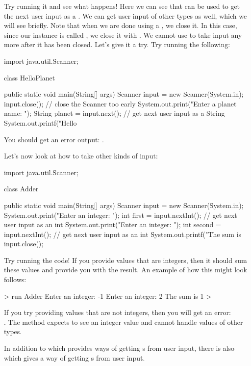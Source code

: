 Try running it and see what happens!
Here we can see that  can be used to get the next
user input as a . We can get user input of other types as well,
which we will see briefly. Note that when we are done using a
, we close it. In this case, since our 
instance is called , we close it with .
We cannot use  to take input any more after it has been closed.
Let's give it a try. Try running the following:
\begin{code}
import java.util.Scanner;

class HelloPlanet {

  public static void main(String[] args) {
    Scanner input = new Scanner(System.in);
    input.close(); // close the Scanner too early
    System.out.print("Enter a planet name: ");
    String planet = input.next(); // get next user input as a String
    System.out.printf("Hello %
  }

}
\end{code}
You should get an error output: .

Let's now look at how to take other kinds of input:
\begin{code}
import java.util.Scanner;

class Adder {

  public static void main(String[] args) {
    Scanner input = new Scanner(System.in);
    System.out.print("Enter an integer: ");
    int first = input.nextInt(); // get next user input as an int
    System.out.print("Enter an integer: ");
    int second = input.nextInt(); // get next user input as an int
    System.out.printf("The sum is %
    input.close();
  }

}
\end{code}
Try running the code!
If you provide values that are integers, then it should sum these
values and provide you with the result. An example of how this might look
follows:
\begin{code}
> run Adder
Enter an integer: -1
Enter an integer: 2
The sum is 1
> 
\end{code}

If you try providing values that are not integers,
then you will get an error:\\.
The method  expects to see an integer value
and cannot handle values of other types.

In addition to  which provides ways of
getting s from user input, there is
also  which gives a way of getting
s from user input.

